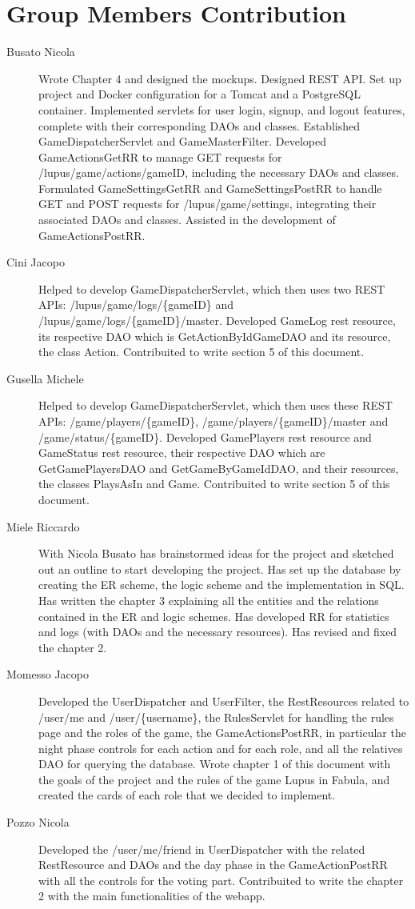\section{Group Members Contribution}


\begin{description}
	\item[Busato Nicola] Wrote Chapter 4 and designed the mockups. Designed REST API. Set up project and Docker configuration for a Tomcat and a PostgreSQL container. Implemented servlets for user login, signup, and logout features, complete with their corresponding DAOs and classes.
    Established GameDispatcherServlet and GameMasterFilter.
    Developed GameActionsGetRR to manage GET requests for /lupus/game/actions/{gameID}, including the necessary DAOs and classes.
    Formulated GameSettingsGetRR and GameSettingsPostRR to handle GET and POST requests for /lupus/game/settings, integrating their associated DAOs and classes.
    Assisted in the development of GameActionsPostRR.
    \item[Cini Jacopo]
    Helped to develop GameDispatcherServlet, which then uses two REST APIs: /lupus/game/logs/\{gameID\} and /lupus/game/logs/\{gameID\}/master. Developed GameLog rest resource, its respective DAO which is GetActionByIdGameDAO and its resource, the class Action. Contribuited to write section 5 of this document.
    \item[Gusella Michele] Helped to develop GameDispatcherServlet, which then uses these REST APIs: /game/players/\{gameID\}, /game/players/\{gameID\}/master and /game/status/\{gameID\}. Developed GamePlayers rest resource and GameStatus rest resource, their respective DAO which are GetGamePlayersDAO and GetGameByGameIdDAO, and their resources, the classes PlaysAsIn and Game. Contribuited to write section 5 of this document.
    \item[Miele Riccardo] With Nicola Busato has brainstormed ideas for the project and sketched out an outline to start developing the project. Has set up the database by creating the ER scheme, the logic scheme and the implementation in SQL. Has written the chapter 3 explaining all the entities and the relations contained in the ER and logic schemes.
    Has developed RR for statistics and logs (with DAOs and the necessary resources). Has revised and fixed the chapter 2.
	\item[Momesso Jacopo] Developed the UserDispatcher and UserFilter, the RestResources related to /user/me and /user/\{username\}, the RulesServlet for handling the rules page and the roles of the game, the GameActionsPostRR, in particular the night phase controls for each action and for each role, and all the relatives DAO for querying the database. Wrote chapter 1 of this document with the goals of the project and the rules of the game Lupus in Fabula, and created the cards of each role that we decided to implement.
    \item[Pozzo Nicola] Developed the /user/me/friend in UserDispatcher with the related RestResource and DAOs and the day phase in the GameActionPostRR with all the controls for the voting part. Contribuited to write the chapter 2 with the main functionalities of the webapp. 
\end{description}
